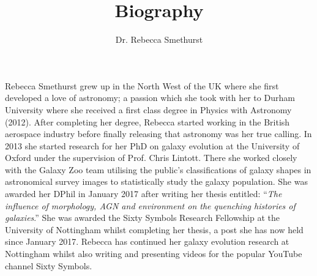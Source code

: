 \documentclass{article}
\begin{document}
\title{Biography}
\author{Dr. Rebecca Smethurst}

\maketitle

Rebecca Smethurst grew up in the North West of the UK where she first developed a love of astronomy; a passion which she took with her to Durham University where she received a first class degree in Physics with Astronomy (2012). After completing her degree, Rebecca started working in the British aerospace industry before finally releasing that astronomy was her true calling. In 2013 she started research for her PhD on galaxy evolution at the University of Oxford under the supervision of Prof. Chris Lintott. There she worked closely with the Galaxy Zoo team utilising the public's classifications of galaxy shapes in astronomical survey images to statistically study the galaxy population. She was awarded her DPhil in January 2017 after writing her thesis entitled: ``\emph{The influence of morphology, AGN and environment on the quenching histories of galaxies}.'' She was awarded the Sixty Symbols Research Fellowship at the University of Nottingham whilst completing her thesis, a post she has now held since January 2017. Rebecca has continued her galaxy evolution research at Nottingham whilst also writing and presenting videos for the popular YouTube channel Sixty Symbols. 
\end{document}
